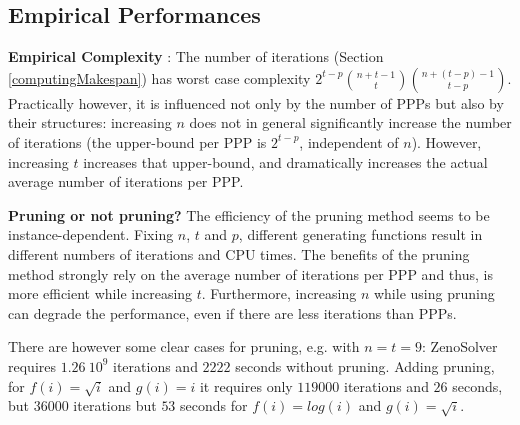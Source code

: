 \documentclass{llncs}
\begin{document}
\subsection{Empirical Performances}

{\bf Empirical Complexity}%
: The number of iterations (Section \ref{computingMakespan}) has worst case complexity $2^{t-p} {n+t-1 \choose t}{n+(t-p)-1 \choose t-p}$. Practically however, it is influenced not only by the number of PPPs but also by their structures: increasing $n$ does not in general significantly increase the number of iterations (the upper-bound per PPP is $2^{t-p}$, independent of $n$). However, increasing $t$ increases that upper-bound, and dramatically increases the actual average number of iterations per PPP.


{\bf Pruning or not pruning?} The efficiency of the pruning method seems to be instance-dependent. Fixing $n$, $t$ and $p$, different generating functions result in different numbers of iterations and CPU times. The benefits of the pruning method strongly rely on the average number of iterations per PPP and thus, is more efficient while increasing $t$. Furthermore, increasing $n$ while using pruning can degrade the performance, even if there are less iterations than PPPs.

There are however some clear cases for pruning, e.g. with $n=t=9$:  ZenoSolver requires $1.26 ~ 10^9$ iterations and $2222$ seconds without pruning. Adding pruning, for $f(i)=\sqrt i$ and $g(i)=i$ it requires only $119 000$ iterations and $26$ seconds, but $36000$ iterations but $53$ seconds for $f(i)=log(i)$ and $g(i)=\sqrt i$. 

\end{document}
